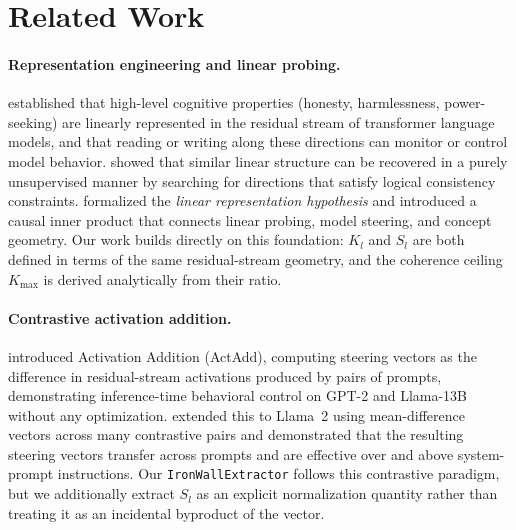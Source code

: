 \documentclass[10pt]{article}
\begin{document}
\section{Related Work}
\label{sec:related}

\paragraph{Representation engineering and linear probing.}
\citet{zou2023representation} established that high-level cognitive properties
(honesty, harmlessness, power-seeking) are linearly represented in the residual
stream of transformer language models, and that reading or writing along these
directions can monitor or control model behavior.  \citet{burns2023latent}
showed that similar linear structure can be recovered in a purely unsupervised
manner by searching for directions that satisfy logical consistency constraints.
\citet{park2023linear} formalized the \emph{linear representation hypothesis}
and introduced a causal inner product that connects linear probing, model
steering, and concept geometry.  Our work builds directly on this foundation:
$K_l$ and $S_l$ are both defined in terms of the same residual-stream geometry,
and the coherence ceiling $K_\text{max}$ is derived analytically from their ratio.

\paragraph{Contrastive activation addition.}
\citet{turner2023activation} introduced Activation Addition (ActAdd), computing
steering vectors as the difference in residual-stream activations produced by
pairs of prompts, demonstrating inference-time behavioral control on GPT-2 and
Llama-13B without any optimization.  \citet{rimsky2023steering} extended this
to Llama~2 using mean-difference vectors across many contrastive pairs and
demonstrated that the resulting steering vectors transfer across prompts and are
effective over and above system-prompt instructions.  Our \texttt{IronWallExtractor}
follows this contrastive paradigm, but we additionally extract $S_l$ as an
explicit normalization quantity rather than treating it as an incidental
byproduct of the vector.
\end{document}
